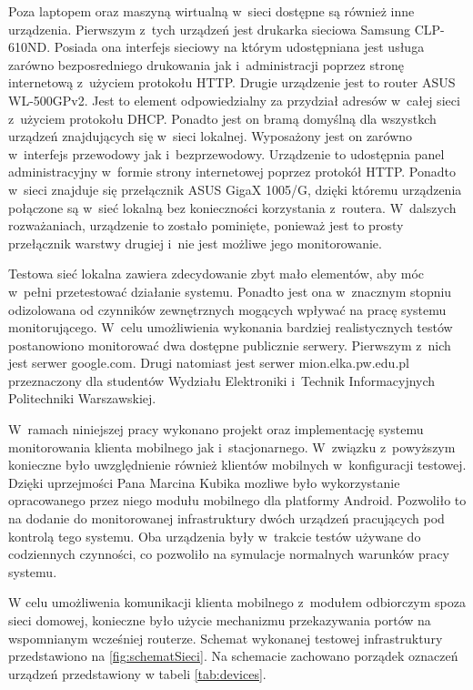 Poza laptopem oraz maszyną wirtualną w~sieci dostępne są również inne
urządzenia. Pierwszym z~tych urządzeń jest drukarka sieciowa Samsung
CLP-610ND. Posiada ona interfejs sieciowy na którym udostępniana jest
usługa zarówno bezposredniego drukowania jak i~administracji poprzez
stronę internetową z~użyciem protokołu HTTP. Drugie urządzenie jest to
router ASUS WL-500GPv2. Jest to element odpowiedzialny za przydział
adresów w~całej sieci z~użyciem protokołu DHCP. Ponadto jest on bramą
domyślną dla wszystkch urządzeń znajdujących się w~sieci
lokalnej. Wyposażony jest on zarówno w~interfejs przewodowy jak
i~bezprzewodowy. Urządzenie to udostępnia panel administracyjny
w~formie strony internetowej poprzez protokół HTTP. Ponadto w~sieci
znajduje się przełącznik ASUS GigaX 1005/G, dzięki któremu urządzenia
połączone są w~sieć lokalną bez konieczności korzystania
z~routera. W~dalszych rozważaniach, urządzenie to zostało pominięte,
ponieważ jest to prosty przełącznik warstwy drugiej i~nie jest możliwe
jego monitorowanie.

Testowa sieć lokalna zawiera zdecydowanie zbyt mało elementów, aby móc
w~pełni przetestować działanie systemu. Ponadto jest ona w~znacznym
stopniu odizolowana od czynników zewnętrznych mogących wpływać na
pracę systemu monitorującego. W~celu umożliwienia wykonania bardziej
realistycznych testów postanowiono monitorować dwa dostępne publicznie
serwery. Pierwszym z~nich jest serwer google.com. Drugi natomiast jest
serwer mion.elka.pw.edu.pl przeznaczony dla studentów Wydziału
Elektroniki i~Technik Informacyjnych Politechniki Warszawskiej.

W~ramach niniejszej pracy wykonano projekt oraz implementację systemu
monitorowania klienta mobilnego jak i~stacjonarnego. W~związku
z~powyższym konieczne było uwzględnienie również klientów mobilnych
w~konfiguracji testowej. Dzięki uprzejmości Pana Marcina Kubika
mozliwe było wykorzystanie opracowanego przez niego modułu mobilnego
dla platformy Android. Pozwoliło to na dodanie do monitorowanej
infrastruktury dwóch urządzeń pracujących pod kontrolą tego
systemu. Oba urządzenia były w~trakcie testów używane do codziennych
czynności, co pozwoliło na symulacje normalnych warunków pracy
systemu.

W celu umożliwenia komunikacji klienta mobilnego z~modułem odbiorczym
spoza sieci domowej, konieczne było użycie mechanizmu przekazywania
portów na wspomnianym wcześniej routerze. Schemat wykonanej testowej
infrastruktury przedstawiono na \ref{fig:schematSieci}. Na schemacie
zachowano porządek oznaczeń urządzeń przedstawiony w tabeli
\ref{tab:devices}.

